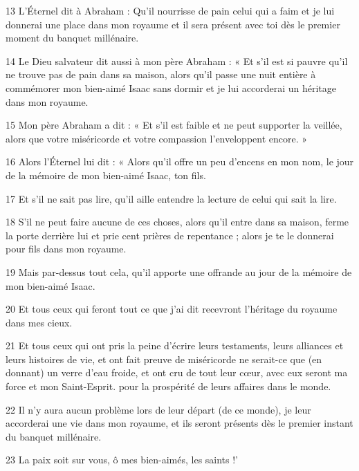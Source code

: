 \par 13 L'Éternel dit à Abraham : Qu'il nourrisse de pain celui qui a faim et je lui donnerai une place dans mon royaume et il sera présent avec toi dès le premier moment du banquet millénaire.

\par 14 Le Dieu salvateur dit aussi à mon père Abraham : « Et s'il est si pauvre qu'il ne trouve pas de pain dans sa maison, alors qu'il passe une nuit entière à commémorer mon bien-aimé Isaac sans dormir et je lui accorderai un héritage dans mon royaume.

\par 15 Mon père Abraham a dit : « Et s'il est faible et ne peut supporter la veillée, alors que votre miséricorde et votre compassion l'enveloppent encore. »

\par 16 Alors l'Éternel lui dit : « Alors qu'il offre un peu d'encens en mon nom, le jour de la mémoire de mon bien-aimé Isaac, ton fils.

\par 17 Et s'il ne sait pas lire, qu'il aille entendre la lecture de celui qui sait la lire.

\par 18 S'il ne peut faire aucune de ces choses, alors qu'il entre dans sa maison, ferme la porte derrière lui et prie cent prières de repentance ; alors je te le donnerai pour fils dans mon royaume.

\par 19 Mais par-dessus tout cela, qu'il apporte une offrande au jour de la mémoire de mon bien-aimé Isaac.

\par 20 Et tous ceux qui feront tout ce que j'ai dit recevront l'héritage du royaume dans mes cieux.

\par 21 Et tous ceux qui ont pris la peine d'écrire leurs testaments, leurs alliances et leurs histoires de vie, et ont fait preuve de miséricorde ne serait-ce que (en donnant) un verre d'eau froide, et ont cru de tout leur cœur, avec eux seront ma force et mon Saint-Esprit. pour la prospérité de leurs affaires dans le monde.

\par 22 Il n'y aura aucun problème lors de leur départ (de ce monde), je leur accorderai une vie dans mon royaume, et ils seront présents dès le premier instant du banquet millénaire.

\par 23 La paix soit sur vous, ô mes bien-aimés, les saints !'

